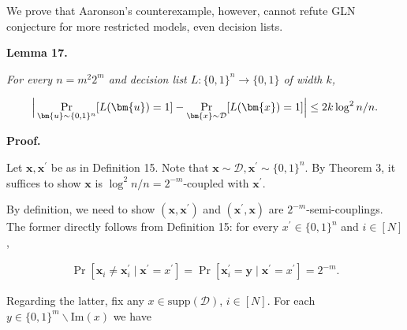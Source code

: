 


We prove that Aaronson’s counterexample, however, cannot refute GLN conjecture for more restricted models, even decision lists.\par





\par\medskip\noindent\textbf{
\textbf{Lemma 17}\textbf{.}
}\par



\emph{For every $n=m^{2}2^{m}$ and decision list $L\colon\{0,1\}^{n}\to\{0,1\}$ of width $k$,}\par


\[\begin{gathered}
\Big{|}\Pr_{\bm{u}\sim\{0,1\}^{n}}[L(\bm{u})=1]-\Pr_{\bm{x}\sim\mathcal{D}}[L(\bm{x})=1]\Big{|}\leq 2k\log^{2}n/n.
\end{gathered}\]






\par\medskip\noindent\textbf{Proof.}\par




Let $\bm{x},\bm{x}^{\prime}$ be as in Definition 15.
Note that $\bm{x}\sim\mathcal{D},\bm{x}^{\prime}\sim\{0,1\}^{n}$.
By Theorem 3, it suffices to show $\bm{x}$ is $\log^{2}n/n=2^{-m}$-coupled with $\bm{x}^{\prime}$.\par




By definition, we need to show $(\bm{x},\bm{x}^{\prime})$ and $(\bm{x}^{\prime},\bm{x})$ are $2^{-m}$-semi-couplings.
The former directly follows from Definition 15:
for every $x^{\prime}\in\{0,1\}^{n}$ and $i\in[N]$,\par


\[\begin{gathered}
\Pr[\bm{x}_{i}\neq\bm{x}^{\prime}_{i}\mid\bm{x}^{\prime}=x^{\prime}]=\Pr[\bm{x}^{\prime}_{i}=\bm{y}\mid\bm{x}^{\prime}=x^{\prime}]=2^{-m}.
\end{gathered}\]


Regarding the latter, fix any $x\in\mathrm{supp}(\mathcal{D})$, $i\in[N]$.
For each $y\in\{0,1\}^{m}\smallsetminus\mathrm{Im}(x)$ we have\par


